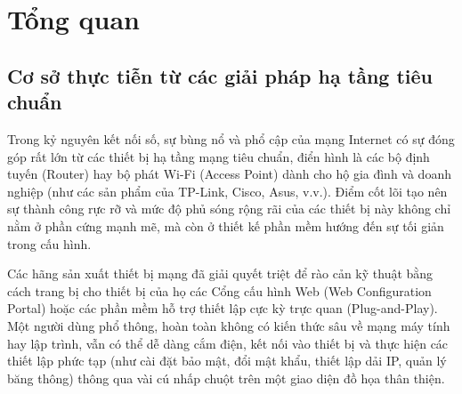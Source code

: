 \section{Tổng quan}\label{sec:tong_quan}

    \subsection{Cơ sở thực tiễn từ các giải pháp hạ tầng tiêu chuẩn}
        Trong kỷ nguyên kết nối số, sự bùng nổ và phổ cập của mạng Internet có sự đóng góp rất lớn từ các thiết bị hạ tầng mạng tiêu chuẩn, điển hình là các bộ định tuyến (Router) hay bộ phát Wi-Fi (Access Point) dành cho hộ gia đình và doanh nghiệp (như các sản phẩm của TP-Link, Cisco, Asus, v.v.). Điểm cốt lõi tạo nên sự thành công rực rỡ và mức độ phủ sóng rộng rãi của các thiết bị này không chỉ nằm ở phần cứng mạnh mẽ, mà còn ở thiết kế phần mềm hướng đến sự tối giản trong cấu hình.

Các hãng sản xuất thiết bị mạng đã giải quyết triệt để rào cản kỹ thuật bằng cách trang bị cho thiết bị của họ các Cổng cấu hình Web (Web Configuration Portal) hoặc các phần mềm hỗ trợ thiết lập cực kỳ trực quan (Plug-and-Play). Một người dùng phổ thông, hoàn toàn không có kiến thức sâu về mạng máy tính hay lập trình, vẫn có thể dễ dàng cắm điện, kết nối vào thiết bị và thực hiện các thiết lập phức tạp (như cài đặt bảo mật, đổi mật khẩu, thiết lập dải IP, quản lý băng thông) thông qua vài cú nhấp chuột trên một giao diện đồ họa thân thiện.

